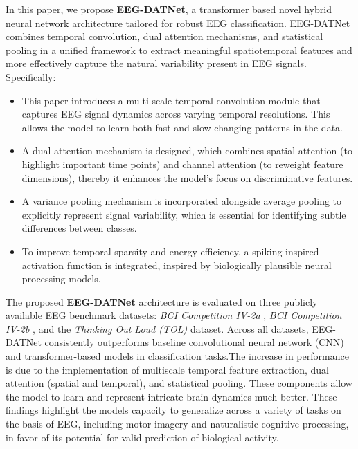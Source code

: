\documentclass[pdflatex,sn-mathphys-num]{sn-jnl}
\theoremstyle{thmstyleone}%
\theoremstyle{thmstyletwo}%
\theoremstyle{thmstylethree}%
\begin{document}
In this paper, we propose \textbf{EEG-DATNet}, a transformer based novel hybrid neural network architecture tailored for robust EEG classification. EEG-DATNet combines temporal convolution, dual attention mechanisms, and statistical pooling in a unified framework to extract meaningful spatiotemporal features and more effectively capture the natural variability present in EEG signals. Specifically:

\begin{itemize}
    \item This paper introduces a multi-scale temporal convolution module that captures EEG signal dynamics across varying temporal resolutions. This allows the model to learn both fast and slow-changing patterns in the data.
    \item A dual attention mechanism is designed, which combines spatial attention (to highlight important time points) and channel attention (to reweight feature dimensions), thereby it enhances the model’s focus on discriminative features.
    
    \item A variance pooling mechanism is incorporated alongside average pooling to explicitly represent signal variability, which is essential for identifying subtle differences between classes.

    \item To improve temporal sparsity and energy efficiency, a spiking-inspired activation function is integrated, inspired by biologically plausible neural processing models.
\end{itemize}

The proposed \textbf{EEG-DATNet} architecture is evaluated on three publicly available EEG benchmark datasets: \textit{BCI Competition IV-2a} \cite{tangermann2012review}, \textit{BCI Competition IV-2b} \cite{leeb2008graz2b}, and the \textit{Thinking Out Loud (TOL)} \cite{nieto2022thinking} dataset. Across all datasets, EEG-DATNet consistently outperforms baseline convolutional neural network (CNN) and transformer-based models in classification tasks.The increase in performance is due to the implementation of multiscale temporal feature extraction, dual attention (spatial and temporal), and statistical pooling. These components allow the model to learn and represent intricate brain dynamics much better. These findings highlight the model\textquotesingle s capacity to generalize across a variety of tasks on the basis of EEG, including motor imagery and naturalistic cognitive processing, in favor of its potential for valid prediction of biological activity.
\end{document}

